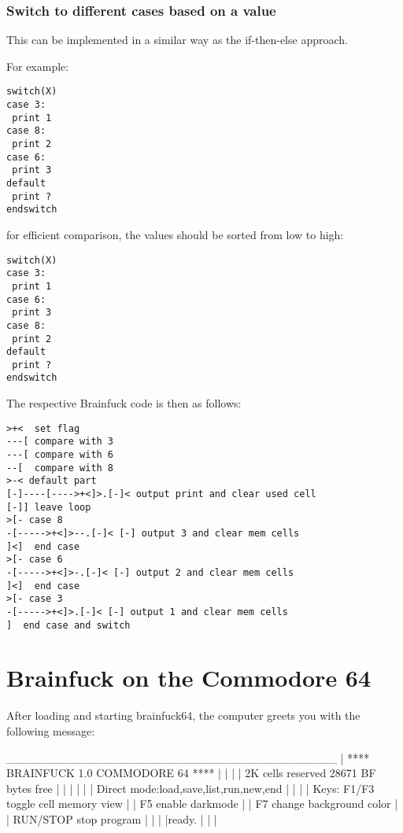 \documentclass[ms,article,a4paper]{memoir}
\begin{document}
\subsubsection{Switch to different cases based on a value}

This can be implemented in a similar way as the if-then-else approach.

For example:
\begin{verbatim}
switch(X)
case 3:
 print 1
case 8:
 print 2
case 6:
 print 3
default
 print ?
endswitch
\end{verbatim}

for efficient comparison, the values should be sorted from low to high:

\begin{verbatim}
switch(X)
case 3:
 print 1
case 6:
 print 3 
case 8:
 print 2
default
 print ?
endswitch
\end{verbatim}

The respective Brainfuck code is then as follows:

\begin{verbatim}
>+<  set flag
---[ compare with 3
---[ compare with 6
--[  compare with 8
>-< default part
[-]----[---->+<]>.[-]< output print and clear used cell
[-]] leave loop
>[- case 8
-[----->+<]>--.[-]< [-] output 3 and clear mem cells
]<]  end case
>[- case 6
-[----->+<]>-.[-]< [-] output 2 and clear mem cells
]<]  end case
>[- case 3
-[----->+<]>.[-]< [-] output 1 and clear mem cells
]  end case and switch
\end{verbatim}

\section{Brainfuck on the Commodore 64}

After loading and starting brainfuck64, the computer greets you with the following message:

\begin{verbbox}
 ________________________________________
|  **** BRAINFUCK 1.0 COMMODORE 64 ****  |
|                                        |
| 2K cells reserved  28671 BF bytes free |
|                                        |
|                                        |
| Direct mode:load,save,list,run,new,end |
|                                        |
| Keys: F1/F3 toggle cell memory view    |
|       F5 enable darkmode               |
|       F7 change background color       |
|       RUN/STOP stop program            |
|                                        |
|ready.                                  |
|                                        |
\end{verbbox}
\centerline{\theverbbox}\vspace{1em}
\end{document}
